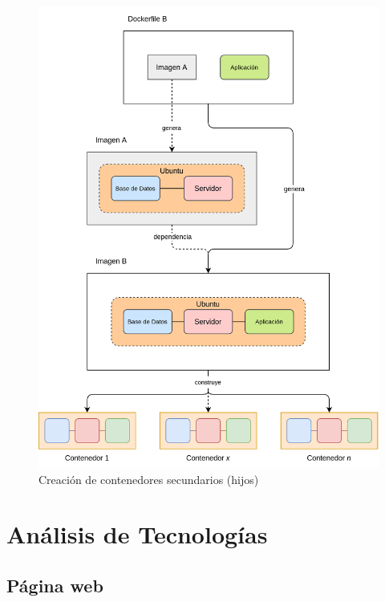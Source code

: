                 \begin{figure}[!htbp]
                    \centering

                    \includegraphics[scale=0.14]{images/Diagramas/Contenedor B.png}

                    \caption{Creación de contenedores secundarios (hijos)}
                    \label{fig:contenedor-hijo}
                \end{figure}
                
                \newpage

    
    \section{Análisis de Tecnologías}

        \subsection{Página web}

